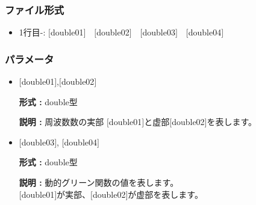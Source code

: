 \documentclass[12pt,titlepage]{jarticle}
\begin{document}
\subsubsection{ファイル形式}
 \begin{itemize}
   \item 1行目-: $[$double01$]$~~$[$double02$]$~~$[$double03$]$~~$[$double04$]$
  \end{itemize}
\subsubsection{パラメータ}
 \begin{itemize}

  \item  $[$double01$]$,$[$double02$]$

 {\bf 形式 :} double型

{\bf 説明 :} 周波数数の実部 $[$double01$]$と虚部$[$double02$]$を表します。
 
 \item  $[$double03$]$, $[$double04$]$

 {\bf 形式 :} double型 

{\bf 説明 :} 動的グリーン関数の値を表します。\\
$[$double01$]$が実部、$[$double02$]$が虚部を表します。\\
\end{itemize}
\end{document}
